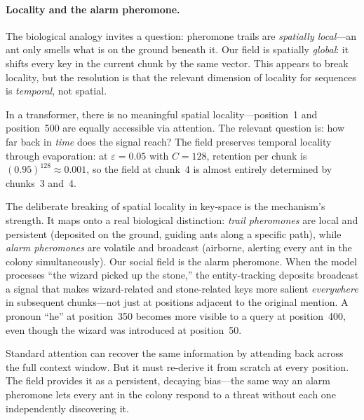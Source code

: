 \documentclass[11pt,a4paper]{article}
\begin{document}
\paragraph{Locality and the alarm pheromone.}
The biological analogy invites a question: pheromone trails are
\emph{spatially local}---an ant only smells what is on the ground
beneath it.  Our field is spatially \emph{global}: it shifts every key
in the current chunk by the same vector.  This appears to break
locality, but the resolution is that the relevant dimension of locality
for sequences is \emph{temporal}, not spatial.

In a transformer, there is no meaningful spatial locality---position~1
and position~500 are equally accessible via attention.  The relevant
question is: how far back in \emph{time} does the signal reach?  The
field preserves temporal locality through evaporation: at
$\varepsilon = 0.05$ with $C = 128$, retention per chunk is
$(0.95)^{128} \approx 0.001$, so the field at chunk~4 is almost
entirely determined by chunks~3 and~4.

The deliberate breaking of spatial locality in key-space is the
mechanism's strength.  It maps onto a real biological distinction:
\emph{trail pheromones} are local and persistent (deposited on the
ground, guiding ants along a specific path), while \emph{alarm
pheromones} are volatile and broadcast (airborne, alerting every ant
in the colony simultaneously).  Our social field is the alarm
pheromone.  When the model processes ``the wizard picked up the
stone,'' the entity-tracking deposits broadcast a signal that makes
wizard-related and stone-related keys more salient \emph{everywhere}
in subsequent chunks---not just at positions adjacent to the original
mention.  A pronoun ``he'' at position~350 becomes more visible to
a query at position~400, even though the wizard was introduced at
position~50.

Standard attention can recover the same information by attending back
across the full context window.  But it must re-derive it from scratch
at every position.  The field provides it as a persistent, decaying
bias---the same way an alarm pheromone lets every ant in the colony
respond to a threat without each one independently discovering it.

\end{document}
